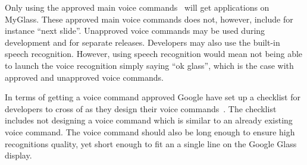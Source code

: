 Only using the approved main voice commands~\cite{existingVoiceCommands} will get applications on MyGlass. These approved main voice commands does not, however, include for instance ``next slide''. Unapproved voice commands may be used during development and for separate releases. Developers may also use the built-in speech recognition. However, using speech recognition would mean not being able to launch the voice recognition simply saying ``ok glass'', which is the case with approved and unapproved voice commands.

In terms of getting a voice command approved Google have set up a checklist for developers to cross of as they design their voice commands~\cite{glassVoiceChecklist}. The checklist includes not designing a voice command which is similar to an already existing voice command. The voice command should also be long enough to ensure high recognitions quality, yet short enough to fit an a single line on the Google Glass display.